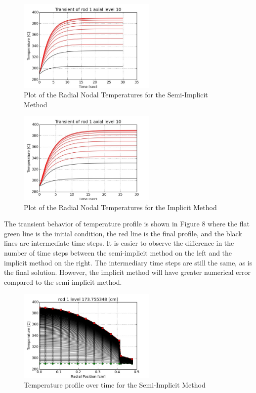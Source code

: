 \begin{figure}[!h]
	\centering
	\includegraphics[width=0.60\textwidth]{images/trans_rod1_axial10_SI.jpg}
	\caption{Plot of the Radial Nodal Temperatures for the Semi-Implicit Method}
	\label{fig:trans_rod1_axial10_SI}
\end{figure}

\begin{figure}[!h]
	\centering
	\includegraphics[width=0.60\textwidth]{images/trans_rod1_axial10_I.jpg}
	\caption{Plot of the Radial Nodal Temperatures for the Implicit Method}
	\label{fig:trans_rod1_axial10_I}
\end{figure}

The transient behavior of temperature profile is shown in Figure 8 where the
flat green line is the initial condition, the red line is the final profile, and
the black lines are intermediate time steps. It is easier to observe the
difference in the number of time steps between the semi-implicit method on the
left and the implicit method on the right. The intermediary time steps are still
the same, as is the final solution. However, the implicit method will have
greater numerical error compared to the semi-implicit method.

\begin{figure}[!h]
	\centering
	\includegraphics[width=0.60\textwidth]{images/profile_rod1_level_10_SI.jpg}
	\caption{Temperature profile over time for the Semi-Implicit Method}
	\label{fig:profile_rod1_level_10_SI}
\end{figure}

